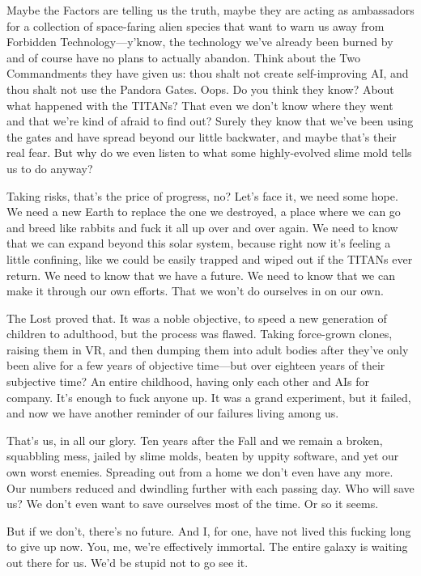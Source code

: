 Maybe the Factors are telling us the truth, maybe they 
are acting as ambassadors for a collection of space-faring alien species that want to warn us away from 
Forbidden Technology—y'know, the technology we've 
already been burned by and of course have no plans 
to actually abandon. Think about the Two Commandments they have given us: thou shalt not create 
self-improving AI, and thou shalt not use the Pandora 
Gates. Oops. Do you think they know? About what 
happened with the TITANs? That even we don't know 
where they went and that we're kind of afraid to find 
out? Surely they know that we've been using the gates 
and have spread beyond our little backwater, and 
maybe that's their real fear. But why do we even listen 
to what some highly-evolved slime mold tells us to 
do anyway?

Taking risks, that's the price of progress, no? Let's 
face it, we need some hope. We need a new Earth to 
replace the one we destroyed, a place where we can go 
and breed like rabbits and fuck it all up over and over 
again. We need to know that we can expand beyond 
this solar system, because right now it's feeling a little 
confining, like we could be easily trapped and wiped 
out if the TITANs ever return. We need to know that 
we have a future. We need to know that we can make 
it through our own efforts. That we won't do ourselves in on our own.

The Lost proved that. It was a noble objective, to 
speed a new generation of children to adulthood, but 
the process was flawed. Taking force-grown clones, 
raising them in VR, and then dumping them into adult 
bodies after they've only been alive for a few years 
of objective time—but over eighteen years of their 
subjective time? An entire childhood, having only 
each other and AIs for company. It's enough to fuck 
anyone up. It was a grand experiment, but it failed, 
and now we have another reminder of our failures 
living among us.

That's us, in all our glory. Ten years after the Fall 
and we remain a broken, squabbling mess, jailed by 
slime molds, beaten by uppity software, and yet our 
own worst enemies. Spreading out from a home we 
don't even have any more. Our numbers reduced and 
dwindling further with each passing day. Who will 
save us? We don't even want to save ourselves most of 
the time. Or so it seems.

But if we don't, there's no future. And I, for one, 
have not lived this fucking long to give up now. You, 
me, we're effectively immortal. The entire galaxy is 
waiting out there for us. We'd be stupid not to go 
see it.


